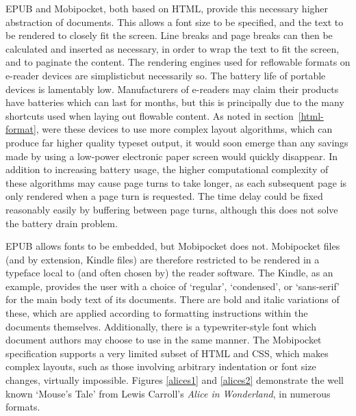 EPUB and Mobipocket, both based on HTML, provide this necessary higher abstraction of documents.
This allows a font size to be specified, and the text to be rendered to closely fit the screen. Line
breaks and page breaks can then be calculated and inserted as necessary, in order to wrap the text
to fit the screen, and to paginate the content. The rendering engines used for reflowable formats on
e-reader devices are simplistic\ed but necessarily so. The battery life of portable devices is
lamentably low. Manufacturers of e-readers may claim their products have batteries which can last
for months, but this is principally due to the many shortcuts used when laying out flowable content.
As noted in section~\ref{html-format}, were these devices to use more complex layout algorithms,
which can produce far higher quality typeset output, it would soon emerge than any savings made by
using a low-power electronic paper screen would quickly disappear. In addition to increasing battery
usage, the higher computational complexity of these algorithms may cause page turns to take longer,
as each subsequent page is only rendered when a page turn is requested. The time delay could be
fixed reasonably easily by buffering between page turns, although this does not solve the battery
drain problem.







EPUB allows fonts to be embedded, but Mobipocket does not. Mobipocket files (and by extension,
Kindle files) are therefore restricted to be rendered in a typeface local to (and often chosen by)
the reader software. The Kindle, as an example, provides the user with a choice of `regular',
`condensed', or `sans-serif' for the main body text of its documents. There are bold and italic
variations of these, which are applied according to formatting instructions within the documents
themselves. Additionally, there is a typewriter-style font which document authors may choose to use
in the same manner. The Mobipocket specification supports a very limited subset of HTML and CSS,
which makes complex layouts, such as those involving arbitrary indentation or font size changes,
virtually impossible. Figures \ref{alices1} and \ref{alices2} demonstrate the well known `Mouse's
Tale' from Lewis Carroll's \emph{Alice in Wonderland}, in numerous formats.


